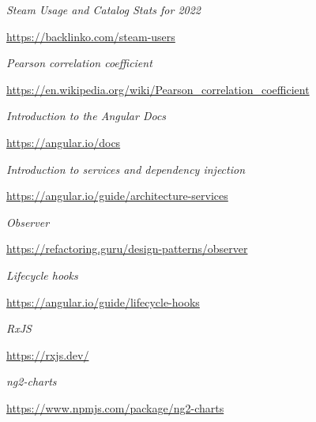 \documentclass[12pt,a4paper]{report}
\begin{document}
\begin{thebibliography}{9}
  
  \textit{Steam Usage and Catalog Stats for 2022}
  
  \url{https://backlinko.com/steam-users}
  
  
  \textit{Pearson correlation coefficient}
  
  \url{https://en.wikipedia.org/wiki/Pearson_correlation_coefficient}
  
  
  \textit{Introduction to the Angular Docs}
  
  \url{https://angular.io/docs}
  
  
  \textit{Introduction to services and dependency injection}
  
  \url{https://angular.io/guide/architecture-services}
  
  
  \textit{Observer}
  
  \url{https://refactoring.guru/design-patterns/observer}
  
  
  \textit{Lifecycle hooks}
  
  \url{https://angular.io/guide/lifecycle-hooks}
  
  
  \textit{RxJS}
  
  \url{https://rxjs.dev/}
  
  
  \textit{ng2-charts}
  
  \url{https://www.npmjs.com/package/ng2-charts}


\end{thebibliography}
\end{document}
